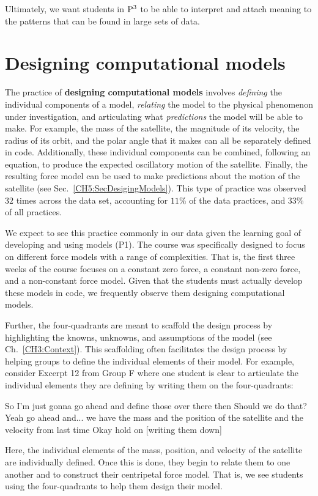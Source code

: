 \documentclass{msuphddissertation}
\begin{document}
\begin{doublespace}
\begin{appendices}
Ultimately, we want students in ${\rm P}^{3}$ to be able to interpret and attach meaning to the patterns that can be found in large sets of data.

\section*{Designing computational models}

The practice of \textbf{designing computational models} involves \textit{defining} the individual components of a model, \textit{relating} the model to the physical phenomenon under investigation, and articulating what \textit{predictions} the model will be able to make.  For example, the mass of the satellite, the magnitude of its velocity, the radius of its orbit, and the polar angle that it makes can all be separately defined in code.  Additionally, these individual components can be combined, following an equation, to produce the expected oscillatory motion of the satellite.  Finally, the resulting force model can be used to make predictions about the motion of the satellite (see Sec.~\ref{CH5:SecDesigingModels}).  This type of practice was observed $32$ times across the data set, accounting for $11\%$ of the data practices, and $33\%$ of all practices.

We expect to see this practice commonly in our data given the learning goal of developing and using models (P1).  The course was specifically designed to focus on different force models with a range of complexities.  That is, the first three weeks of the course focuses on a constant zero force, a constant non-zero force, and a non-constant force model.  Given that the students must actually develop these models in code, we frequently observe them designing computational models.

Further, the four-quadrants are meant to scaffold the design process by highlighting the knowns, unknowns, and assumptions of the model (see Ch.~\ref{CH3:Context}).  This scaffolding often facilitates the design process by helping groups to define the individual elements of their model.  For example, consider Excerpt 12 from Group F where one student is clear to articulate the individual elements they are defining by writing them on the four-quadrants: \begin{description}
\SA So I'm just gonna go ahead and define those over there then
\SA [writing on 4Q]
\SA Should we do that?
\SB Yeah go ahead and... we have the mass
\SB and the position of the satellite
\SC and the velocity from last time
\SA Okay hold on [writing them down]
\end{description}  Here, the individual elements of the mass, position, and velocity of the satellite are individually defined.  Once this is done, they begin to relate them to one another and to construct their centripetal force model.  That is, we see students using the four-quadrants to help them design their model.


\end{appendices}
\end{doublespace}
\end{document}
